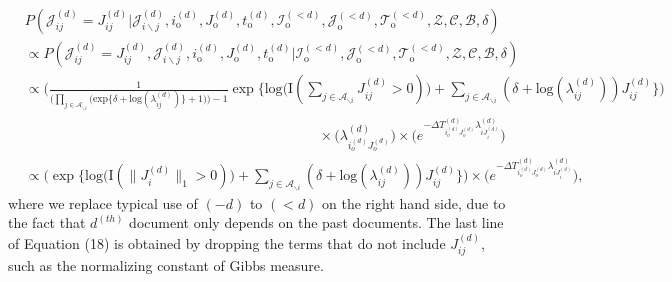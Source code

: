 \documentclass[a4paper]{article}
\begin{document}
   \begin{equation}
   \begin{aligned}
   &P(\mathcal{J}^{(d)}_{ij} = {J}^{(d)}_{ij}|\mathcal{J}^{(d)}_{i\backslash j}, i^{(d)}_{\mbox{o}}, J^{(d)}_{\mbox{o}}, t^{(d)}_{\mbox{o}}, \mathcal{I}^{(<d)}_{\mbox{o}}, \mathcal{J}^{(<d)}_{\mbox{o}}, \mathcal{T}^{(<d)}_{\mbox{o}}, \mathcal{Z}, \mathcal{C}, \mathcal{B}, \delta)\\&\propto P(\mathcal{J}^{(d)}_{ij} ={J}^{(d)}_{ij}, \mathcal{J}^{(d)}_{i\backslash j}, i^{(d)}_{\mbox{o}}, J^{(d)}_{\mbox{o}}, t^{(d)}_{\mbox{o}}| \mathcal{I}^{(<d)}_{\mbox{o}}, \mathcal{J}^{(<d)}_{\mbox{o}}, \mathcal{T}^{(<d)}_{\mbox{o}}, \mathcal{Z}, \mathcal{C}, \mathcal{B}, \delta)
   \\&\propto\Big( \frac{1}{\Big(\prod_{j \in \mathcal{A}_{\backslash i}} \Big(\mbox{exp}\{\delta+\mbox{log}(\lambda_{ij}^{(d)})\} + 1\Big)\Big)-1}\exp\Big\{\mbox{log}\big(\text{I}( \sum_{j \in \mathcal{A}_{\backslash i}} J^{(d)}_{ij} > 0 )\big) +\sum_{j \in \mathcal{A}_{\backslash i}} (\delta+\mbox{log}(\lambda_{ij}^{(d)}))J_{ij}^{(d)} \Big\}\Big)\\&\quad\quad\quad\quad\quad\quad\quad\quad\quad\quad\quad\quad\quad\quad\quad\quad\quad\quad\quad\quad\quad\times \Big(\lambda^{(d)}_{i_o^{(d)}J_{o}^{(d)}}\Big)\times \Big(e^{-\Delta T^{(d)}_{i_o^{(d)}J_o^{(d)}}\lambda^{(d)}_{iJ^{(d)}_{i}}}\Big)
   \\& \propto \Big(\exp\Big\{\mbox{log}\big(\text{I}( \lVert J_i^{(d)} \rVert_1 > 0 )\big) +\sum_{j \in \mathcal{A}_{\backslash i}} (\delta+\mbox{log}(\lambda_{ij}^{(d)}))J_{ij}^{(d)} \Big\}\Big)\times \Big(e^{-\Delta T^{(d)}_{i_o^{(d)}J_o^{(d)}}\lambda^{(d)}_{iJ^{(d)}_{i}}}\Big),
   \end{aligned}
   \end{equation}
   where we replace typical use of $(-d)$ to $(<d)$ on the right hand side, due to the fact that $d^{(th)}$ document only depends on the past documents. The last line of Equation (18) is obtained by dropping the terms that do not include $J^{(d)}_{ij}$, such as the normalizing constant of Gibbs measure. 
   
\end{document}
